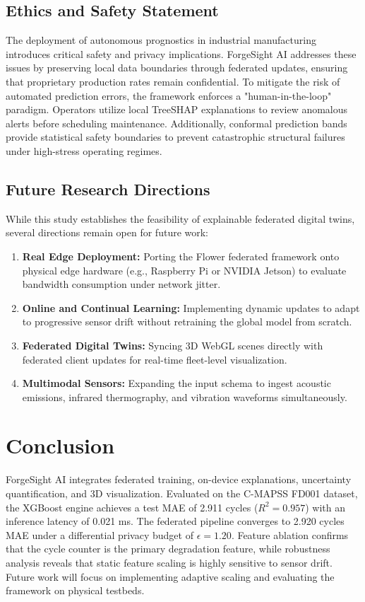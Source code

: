 \documentclass[letterpaper, 10 pt, conference]{ieeeconf}
\begin{document}
\subsection{Ethics and Safety Statement}
\label{subsec:ethics_safety}
The deployment of autonomous prognostics in industrial manufacturing introduces critical safety and privacy implications. ForgeSight AI addresses these issues by preserving local data boundaries through federated updates, ensuring that proprietary production rates remain confidential. To mitigate the risk of automated prediction errors, the framework enforces a "human-in-the-loop" paradigm. Operators utilize local TreeSHAP explanations to review anomalous alerts before scheduling maintenance. Additionally, conformal prediction bands provide statistical safety boundaries to prevent catastrophic structural failures under high-stress operating regimes.

\subsection{Future Research Directions}
\label{subsec:future_directions}
While this study establishes the feasibility of explainable federated digital twins, several directions remain open for future work:
\begin{enumerate}
    \item \textbf{Real Edge Deployment:} Porting the Flower federated framework onto physical edge hardware (e.g., Raspberry Pi or NVIDIA Jetson) to evaluate bandwidth consumption under network jitter.
    \item \textbf{Online and Continual Learning:} Implementing dynamic updates to adapt to progressive sensor drift without retraining the global model from scratch.
    \item \textbf{Federated Digital Twins:} Syncing 3D WebGL scenes directly with federated client updates for real-time fleet-level visualization.
    \item \textbf{Multimodal Sensors:} Expanding the input schema to ingest acoustic emissions, infrared thermography, and vibration waveforms simultaneously.
\end{enumerate}

\section{Conclusion}
\label{sec:conclusion}
ForgeSight AI integrates federated training, on-device explanations, uncertainty quantification, and 3D visualization. Evaluated on the C-MAPSS FD001 dataset, the XGBoost engine achieves a test MAE of 2.911 cycles ($R^2 = 0.957$) with an inference latency of 0.021 ms. The federated pipeline converges to 2.920 cycles MAE under a differential privacy budget of $\epsilon = 1.20$. Feature ablation confirms that the cycle counter is the primary degradation feature, while robustness analysis reveals that static feature scaling is highly sensitive to sensor drift. Future work will focus on implementing adaptive scaling and evaluating the framework on physical testbeds.
\end{document}
